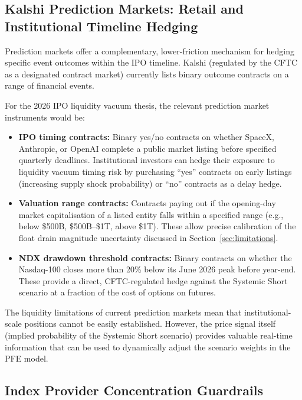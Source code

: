 \subsection{Kalshi Prediction Markets: Retail and Institutional Timeline Hedging}

Prediction markets offer a complementary, lower-friction mechanism for hedging specific
event outcomes within the IPO timeline. Kalshi (regulated by the CFTC as a designated
contract market) currently lists binary outcome contracts on a range of financial events.

For the 2026 IPO liquidity vacuum thesis, the relevant prediction market instruments would be:

\begin{itemize}
  \item \textbf{IPO timing contracts:} Binary yes/no contracts on whether SpaceX, Anthropic,
        or OpenAI complete a public market listing before specified quarterly deadlines.
        Institutional investors can hedge their exposure to liquidity vacuum timing risk by
        purchasing ``yes'' contracts on early listings (increasing supply shock probability)
        or ``no'' contracts as a delay hedge.
  \item \textbf{Valuation range contracts:} Contracts paying out if the opening-day
        market capitalisation of a listed entity falls within a specified range
        (e.g., below \$500B, \$500B--\$1T, above \$1T). These allow precise calibration
        of the float drain magnitude uncertainty discussed in Section~\ref{sec:limitations}.
  \item \textbf{NDX drawdown threshold contracts:} Binary contracts on whether the
        Nasdaq-100 closes more than 20\% below its June 2026 peak before year-end.
        These provide a direct, CFTC-regulated hedge against the Systemic Short scenario
        at a fraction of the cost of options on futures.
\end{itemize}

The liquidity limitations of current prediction markets mean that institutional-scale
positions cannot be easily established. However, the price signal itself (implied
probability of the Systemic Short scenario) provides valuable real-time information
that can be used to dynamically adjust the scenario weights in the PFE model.

\subsection{Index Provider Concentration Guardrails}

